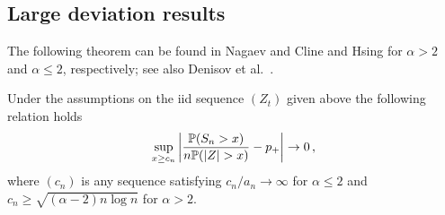 \subsection{Large deviation results}
The following theorem can be found in
Nagaev \cite{nagaev:1979} and Cline and Hsing
\cite{cline:hsing:1998} for $\alpha>2$ and $\alpha\le 2$,
respectively; see also  Denisov et al.~\cite{denisov:dieker:shneer:2008}.
\begin{theorem}\label{thm:nagaev} 
Under the assumptions on the iid sequence $(Z_t)$
given above the following relation holds
\begin{equation*}
\sup_{x\ge c_n}\left|\dfrac{\P(S_n>x )}{n\P(|Z|>x)} -p_+ \right|\to 0\,,
\end{equation*}
where $(c_n)$ is any sequence satisfying $c_n/a_n\to  \infty$ for
$\alpha\le 2$ and $c_n\ge \sqrt{(\alpha-2)n\log n}$ for $\alpha>2$.
\end{theorem}

